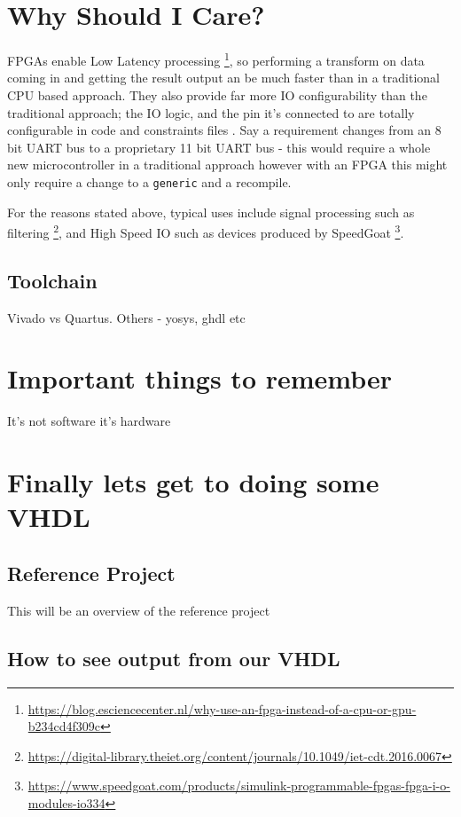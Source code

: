 \documentclass[11pt,a4paper]{article}
\newlength\myheight
\newlength\mydepth
\newcommand*\inlinegraphics[1]{%
  \settototalheight\myheight{Xygp}%
  \settodepth\mydepth{Xygp}%
  \raisebox{-\mydepth}{\texttt{[image: \#1]}}%
}
\newcommand{\handwaving}{\inlinegraphics{./src/hand.png}}
\begin{document}
\pagebreak
\tableofcontents
\listoffigures
\pagebreak

\setlength{\parskip}{\medskipamount}

\section{Why Should I Care?}
FPGAs enable Low Latency processing \footnote{\url{https://blog.esciencecenter.nl/why-use-an-fpga-instead-of-a-cpu-or-gpu-b234cd4f309c}}, so performing a transform on data coming in and getting the result output an be much faster than in a traditional CPU based approach. They also provide far more IO configurability than the traditional approach; the IO logic, and the pin it's connected to are totally configurable in code and constraints files\handwaving. Say a requirement changes from an 8 bit UART bus to a proprietary 11 bit UART bus - this would require a whole new microcontroller in a traditional approach however with an FPGA this might only require a change to a \texttt{generic} and a recompile. 

For the reasons stated above, typical uses include signal processing such as filtering \footnote{\url{https://digital-library.theiet.org/content/journals/10.1049/iet-cdt.2016.0067}}, and High Speed IO such as devices produced by SpeedGoat \footnote{\url{https://www.speedgoat.com/products/simulink-programmable-fpgas-fpga-i-o-modules-io334}}.

\subsection{Toolchain}
Vivado vs Quartus. Others - yosys, ghdl etc
\section{Important things to remember}
It's not software it's hardware
\section{Finally lets get to doing some VHDL}
\subsection{Reference Project}
This will be an overview of the reference project
\subsection{How to see output from our VHDL}
\end{document}
